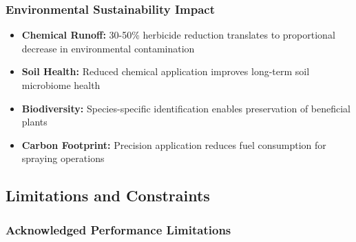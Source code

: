 \subsubsection{Environmental Sustainability Impact}

\begin{itemize}
    \item \textbf{Chemical Runoff:} 30-50\% herbicide reduction translates to proportional decrease in environmental contamination
    \item \textbf{Soil Health:} Reduced chemical application improves long-term soil microbiome health
    \item \textbf{Biodiversity:} Species-specific identification enables preservation of beneficial plants
    \item \textbf{Carbon Footprint:} Precision application reduces fuel consumption for spraying operations
\end{itemize}

\subsection{Limitations and Constraints}

\subsubsection{Acknowledged Performance Limitations}

